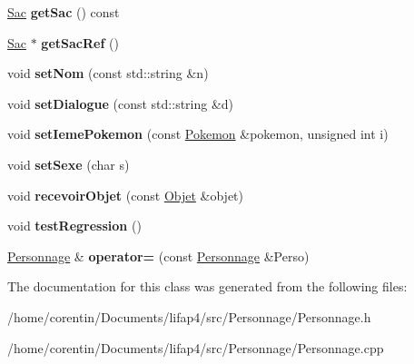 \begin{DoxyCompactItemize}
\hyperlink{class_sac}{Sac} {\bfseries get\+Sac} () const
\item 
\mbox{\label{class_personnage_acb7d9ff9b6b6753b8c93fae58f428db1}} 
\hyperlink{class_sac}{Sac} $\ast$ {\bfseries get\+Sac\+Ref} ()
\item 
\mbox{\label{class_personnage_a46d6d6f6f9b647c04c1cad509bec0935}} 
void {\bfseries set\+Nom} (const std\+::string \&n)
\item 
\mbox{\label{class_personnage_af72b99d62adf0fa6bda389bc58fdcd7d}} 
void {\bfseries set\+Dialogue} (const std\+::string \&d)
\item 
\mbox{\label{class_personnage_ae9e94e72e002695ae1461aa538e5e880}} 
void {\bfseries set\+Ieme\+Pokemon} (const \hyperlink{class_pokemon}{Pokemon} \&pokemon, unsigned int i)
\item 
\mbox{\label{class_personnage_a862b4dd5006dec4d542550b1a1e308db}} 
void {\bfseries set\+Sexe} (char s)
\item 
\mbox{\label{class_personnage_a70fb0f0180dd625cf96dfc469ae5710e}} 
void {\bfseries recevoir\+Objet} (const \hyperlink{class_objet}{Objet} \&objet)
\item 
\mbox{\label{class_personnage_a8b827a72e42d38de1b6d29dee145a4b5}} 
void {\bfseries test\+Regression} ()
\item 
\mbox{\label{class_personnage_a6727627eb37382d3d8f12514551df9bd}} 
\hyperlink{class_personnage}{Personnage} \& {\bfseries operator=} (const \hyperlink{class_personnage}{Personnage} \&Perso)
\end{DoxyCompactItemize}


The documentation for this class was generated from the following files\+:\begin{DoxyCompactItemize}
\item 
/home/corentin/\+Documents/lifap4/src/\+Personnage/Personnage.\+h\item 
/home/corentin/\+Documents/lifap4/src/\+Personnage/Personnage.\+cpp\end{DoxyCompactItemize}
